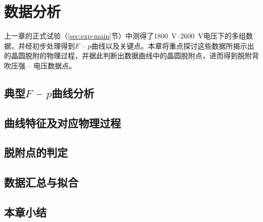\cleardoublepage
\chapter{数据分析}\label{ch:analysis}

上一章的正式试验（\ref{sec:exp-main}节）中测得了\SIrange{1800}{2600}{\V}电压下的多组数据，并经初步处理得到$F$ -- $p$曲线以及关键点。本章将重点探讨这些数据所揭示出的晶圆脱附的物理过程，并据此判断出数据曲线中的晶圆脱附点，进而得到脱附背吹压强 -- 电压数据点。

\section{典型$F$ -- $p$曲线分析}\label{sec:analysis-example}
\section{曲线特征及对应物理过程}\label{sec:analysis-feature}
\section{脱附点的判定}\label{sec:analysis-criterion}
\section{数据汇总与拟合}\label{sec:analysis-tally}
\section{本章小结}\label{sec:analysis-summary}